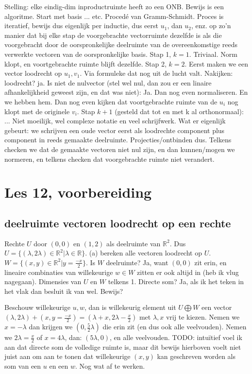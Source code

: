 \documentclass{article}
\begin{document}
Stelling: elke eindig-dim inproductruimte heeft zo een ONB. 
Bewijs is een algoritme. Start met basis ... etc. Proced\'e van Gramm-Schmidt. Proces is iteratief, bewijs dus eigenlijk per inductie, dus eerst $u_1$, dan $u_2$, enz. op zo'n manier dat bij elke stap de voorgebrachte vectorruimte dezelfde is als die voorgebracht door de oorspronkelijke deelruimte van de overeenkomstige reeds verwerkte vectoren van de oorspronkelijke basis. 
Stap 1, $k=1$. Triviaal. Norm klopt, en voortgebrachte ruimte blijft dezelfde. 
Stap 2, $k=2$. Eerst maken we een vector loodrecht op $u_1,v_1$. Via formuleke dat nog uit de lucht valt. Nakijken: loodrecht? ja. Is niet de nulvector (stel wel nul, dan zou er een linaire afhankelijkheid geweest zijn, en dat was niet): Ja. Dan nog even normaliseren. En we hebben hem. Dan nog even kijken dat voortgebrachte ruimte van de $u_i$ nog klopt met de originele $v_i$. 
Stap $k+1$ (gesteld dat tot en met k al orthonormaal): ... 
Niet moeilijk, wel complexe notatie en veel schrijfwerk. Wat er eigenlijk gebeurt: we schrijven een oude vector eerst als loodrechte component plus component in reeds gemaakte deelruimte. Projecties/ontbinden dus. Telkens checken we dat de gemaakte vectoren niet nul zijn, en dan kunnen/mogen we normeren, en telkens checken dat voorgebrachte ruimte niet verandert.  

\section{Les 12, voorbereiding}

\subsection{deelruimte vectoren loodrecht op een rechte}
Rechte $U$ door $(0,0)$ en $(1,2)$ als deelruimte van $\mathbb{R}^2$. Dus $U=\{  (\lambda, 2\lambda) \in \mathbb{R}^2 | \lambda \in \mathbb{R} \}$. 
(a) bereken alle vectoren loodrecht op $U$. $W = \{  (x,y) \in \mathbb{R}^2 | y=\frac{-x}{2} \}$. 
Is $W$  deelruimte? Ja, want $(0,0)$ zit erin, en lineaire combinaties van willekeurige $w \in W$ zitten er ook altijd in (heb ik vlug nagegaan). 
Dimensies van $U$ en $W$ telkens 1. 
Directe som? Ja, als ik het teken in het vlak dan besluit ik van wel. 
Bewijs? 


Beschouw willekeurige $u, w$, dan is willekeurig element uit $U \bigoplus W$ een vector $  (\lambda, 2\lambda)  + (x,y=\frac{-x}{2}) = (\lambda + x , 2\lambda - \frac{x}{2})  $ met $\lambda, x$ vrij te kiezen. 
Nemen we $x=-\lambda$ dan krijgen we $(0, \frac{5}{2}\lambda)$ die erin zit (en dus ook alle veelvouden).  Nemen we $ 2\lambda = \frac{x}{2} $ of $x=4 \lambda$, dan: $( 5\lambda , 0)$, en alle veelvouden. 
TODO: intu\"itief voel ik aan dat directe som de volledige ruimte is, maar dit bewijs hierboven voelt niet juist aan om aan te tonen dat willekeurige $(x,y)$ kan geschreven worden als som van een $u$ en een $w$. Nog wat af te werken. 
\end{document}

